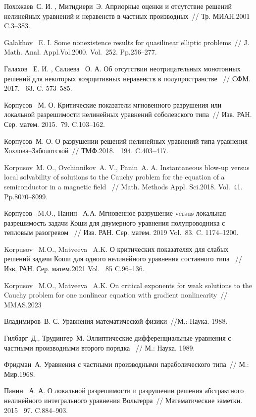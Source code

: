 \begin{thebibliography}{9}
   Похожаев~С. И. ,  Митидиери~Э.  Априорные оценки и отсутствие решений нелинейных уравнений и неравенств в частных производных~// Тр. МИАН.2001    C.3--383.

  Galakhov ~E. I.  Some nonexistence results for quasilinear elliptic problems~// J. Math. Anal. Appl.Vol.2000. Vol.~252. Pp.256--277.

 Галахов ~Е. И. , Салиева ~О. А. Об отсутствии неотрицательных монотонных решений для некоторых коэрцитивных неравенств в полупространстве ~// СФМ. 2017.  \textnumero~63. C. 573--585.

  Корпусов ~М. О.  Критические показатели мгновенного разрушения или локальной разрешимости нелинейных уравнений соболевского типа~// Изв. РАН. Сер. матем. 2015.\textnumero~79. C.103--162.

   Корпусов~М. О.  О разрушении решений нелинейных уравнений типа уравнения Хохлова–Заболотской~// ТМФ.2018. \textnumero~194. C.403--417.

  Korpusov~M. O., Ovchinnikov~A. V., Panin~A. A.  Instantaneous blow-up versus local solvability of solutions to the Cauchy problem for the equation of a semiconductor in a magnetic field ~// Math. Methods Appl. Sci.2018. Vol.~41. Pp.8070--8099.

  Корпусов  ~M.O., Панин ~А.А.  Мгновенное разрушение versus локальная разрешимость задачи Коши для двумерного уравнения полупроводника с тепловым разогревом ~// Изв. РАН. Сер. матем. 2019 Vol.~83. C. 1174--1200.

   Korpusov ~M.O., Matveeva ~A.K.  О критических показателях для слабых решений задачи Коши для одного нелинейного уравнения составного типа ~// Изв. РАН. Сер. матем.2021 Vol.~ 85 C.96--136.

   Korpusov ~M.O., Matveeva ~A.K.  On critical exponents for weak solutions to the Cauchy problem for one nonlinear equation with gradient nonlinearity~// MMAS.2023








  Владимиров~В. С.   Уравнения математической физики~//М.: Наука. 1988.

  Гилбарг~Д., Трудингер~М. Эллиптические дифференциальные уравнения с частными производными второго порядка ~// М.: Наука. 1989.

   Фридман~А. Уравнения с частными производными параболического типа~// М.: Мир.1968.

  Панин ~А. А. О локальной разрешимости и разрушении решения абстрактного нелинейного интегрального уравнения Вольтерра~// Математические заметки. 2015 \textnumero~97. C.884--903.




\end{thebibliography}





%

